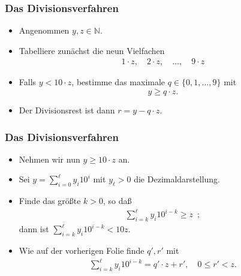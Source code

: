 \documentclass{beamer}
\newcommand\NN{\mathbb N}
\renewcommand{\ae}{\"a}
\renewcommand{\oe}{\"o}
\begin{document}
\begin{frame}\frametitle{Das Divisionsverfahren}
\begin{block}{}
\begin{itemize}
\item Angenommen $y,z\in\NN$.
	\item Tabelliere zun\ae chst die neun Vielfachen
		\begin{align*}
		1\cdot z,\quad 2\cdot z,\quad\ldots,\quad 9\cdot z
		\end{align*}
	\item Falls $y< 10\cdot z$, bestimme das maximale $q\in\{0,1,\ldots,9\}$ mit $$y\geq q\cdot z.$$
	\item Der Divisionsrest ist dann $r=y-q\cdot z$.
\end{itemize}
\end{block}
\end{frame}

\begin{frame}\frametitle{Das Divisionsverfahren}
	\begin{block}{}
		\begin{itemize}
			\item Nehmen wir nun $y\geq 10\cdot z$ an.
			\item Sei $y=\sum_{i=0}^\ell y_i10^i$ mit $y_\ell>0$ die Dezimaldarstellung.
			\item Finde das gr\oe\ss te $k>0$, so da\ss\ 
				\begin{align*}
					\sum_{i=k}^\ell y_i10^{i-k}\geq z\enspace;
				\end{align*}
				dann ist $\sum_{i=k}^\ell y_i10^{i-k}< 10z$.
			\item Wie auf der vorherigen Folie finde $q',r'$ mit
				\begin{align*}
					\sum_{i=k}^\ell y_i10^{i-k}=q'\cdot z+r',\quad 0\leq r'<z.
				\end{align*}
		\end{itemize}
	\end{block}
\end{frame}
\end{document}
